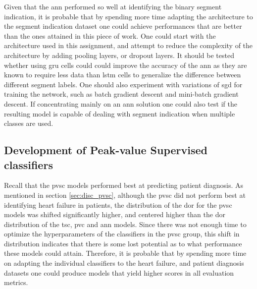 Given that the \acrshort{ann} performed so well at identifying the binary segment indication, it is probable that by spending more time adapting the architecture to the segment indication dataset one could achieve performances that are better than the ones attained in this piece of work. One could start with the architecture used in this assignment, and attempt to reduce the complexity of the architecture by adding pooling layers, or dropout layers. It should be tested whether using \acrshort{gru} cells could could improve the accuracy of the \acrshort{ann} as they are known to require less data than \acrshort{lstm} cells to generalize the difference between different segment labels. One should also experiment with variations of \acrshort{sgd} for training the network, such as batch gradient descent and mini-batch gradient descent. If concentrating mainly on an \acrshort{ann} solution one could also test if the resulting model is capable of dealing with segment indication when multiple classes are used. 

\subsection*{Development of Peak-value Supervised classifiers}

Recall that the \acrshort{pvsc} models performed best at predicting patient diagnosis. As mentioned in section \ref{sec:disc_pvsc}, although the \acrshort{pvsc} did not perform best at identifying heart failure in patients, the distribution of the \acrshort{dor} for the \acrshort{pvsc} models was shifted significantly higher, and centered higher than the \acrshort{dor} distribution of the \acrshort{tsc}, \acrshort{pvc} and \acrshort{ann} models. Since there was not enough time to optimize the hyperparameters of the classifiers in the \acrshort{pvsc} group, this shift in distribution indicates that there is some lost potential as to what performance these models could attain. Therefore, it is probable that by spending more time on adapting the individual classifiers to the heart failure, and patient diagnosis datasets one could produce models that yield higher scores in all evaluation metrics.